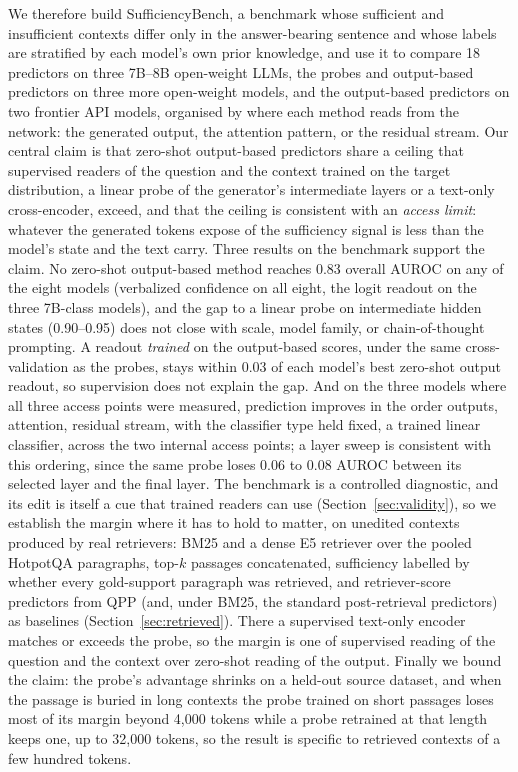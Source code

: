 \documentclass[acmsmall,screen,review]{acmart}
\newcommand{\bench}{SufficiencyBench}
\begin{document}
We therefore build \bench{}, a benchmark whose sufficient and insufficient contexts differ only in the answer-bearing sentence and whose labels are stratified by each model's own prior knowledge, and use it to compare 18 predictors on three 7B--8B open-weight LLMs, the probes and output-based predictors on three more open-weight models, and the output-based predictors on two frontier API models, organised by where each method reads from the network: the generated output, the attention pattern, or the residual stream. Our central claim is that zero-shot output-based predictors share a ceiling that supervised readers of the question and the context trained on the target distribution, a linear probe of the generator's intermediate layers or a text-only cross-encoder, exceed, and that the ceiling is consistent with an \emph{access limit}: whatever the generated tokens expose of the sufficiency signal is less than the model's state and the text carry. Three results on the benchmark support the claim. No zero-shot output-based method reaches 0.83 overall AUROC on any of the eight models (verbalized confidence on all eight, the logit readout on the three 7B-class models), and the gap to a linear probe on intermediate hidden states (0.90--0.95) does not close with scale, model family, or chain-of-thought prompting. A readout \emph{trained} on the output-based scores, under the same cross-validation as the probes, stays within 0.03 of each model's best zero-shot output readout, so supervision does not explain the gap. And on the three models where all three access points were measured, prediction improves in the order outputs, attention, residual stream, with the classifier type held fixed, a trained linear classifier, across the two internal access points; a layer sweep is consistent with this ordering, since the same probe loses 0.06 to 0.08 AUROC between its selected layer and the final layer. The benchmark is a controlled diagnostic, and its edit is itself a cue that trained readers can use (Section~\ref{sec:validity}), so we establish the margin where it has to hold to matter, on unedited contexts produced by real retrievers: BM25 and a dense E5 retriever over the pooled HotpotQA paragraphs, top-$k$ passages concatenated, sufficiency labelled by whether every gold-support paragraph was retrieved, and retriever-score predictors from QPP (and, under BM25, the standard post-retrieval predictors) as baselines (Section~\ref{sec:retrieved}). There a supervised text-only encoder matches or exceeds the probe, so the margin is one of supervised reading of the question and the context over zero-shot reading of the output. Finally we bound the claim: the probe's advantage shrinks on a held-out source dataset, and when the passage is buried in long contexts the probe trained on short passages loses most of its margin beyond 4,000 tokens while a probe retrained at that length keeps one, up to 32,000 tokens, so the result is specific to retrieved contexts of a few hundred tokens.
\end{document}
